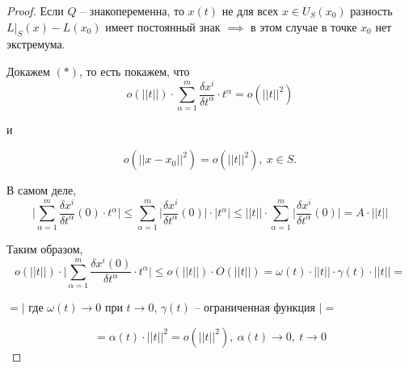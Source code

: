 \documentclass{report}
\theoremstyle{definition}
\begin{document}
\begin{proof}
  Если $Q$ -- знакопеременна, то $x(t)$ не для всех $x \in U_S(x_0)$ разность $L\big|_S(x) - L(x_0)$ имеет постоянный знак $\implies$ в этом случае в точке $x_0$ нет экстремума.

  Докажем $(*)$, то есть покажем, что
  \begin{equation*}
    o(||t||) \cdot \sum_{\alpha = 1}^{m} \frac{\delta x^i}{\delta t^\alpha}\cdot t^\alpha = o(||t||^2)
  \end{equation*}
  \begin{center}
    и
  \end{center}
  \begin{equation*}
    o(||x-x_0||^2) = o(||t||^2), \ x \in S.
  \end{equation*}

  В самом деле,
  \begin{equation*}
    \bigg| \sum_{\alpha=1}^{m}\frac{\delta x^i}{\delta t^\alpha}(0)\cdot t^\alpha\bigg| \leqslant \sum_{\alpha=1}^{m}\bigg|\frac{\delta x^i}{\delta t^\alpha}(0)\bigg| \cdot \big|t^\alpha \big| \leqslant ||t|| \cdot \sum_{\alpha = 1}^{m} \bigg|\frac{\delta x^i}{\delta t^\alpha}(0)\bigg| = A\cdot ||t||
  \end{equation*}

  Таким образом,
  \begin{equation*}
    o(||t||) \cdot \bigg|\sum_{\alpha = 1}^{m}\frac{\delta x^i(0)}{\delta t^\alpha}\cdot t^\alpha \bigg| \leqslant o(||t||)\cdot O(||t||) = \omega(t)\cdot ||t|| \cdot \gamma(t) \cdot ||t|| =
  \end{equation*}
  \begin{center}
    $= \bigg|$ где $\omega(t)\rightarrow0$ при $t\rightarrow 0$, $\gamma(t)$ -- ограниченная функция $\bigg| =$
  \end{center}
  \begin{equation*}
    = \alpha(t) \cdot ||t||^2 = o(||t||^2), \ \alpha(t)\rightarrow 0, \ t\rightarrow 0
  \end{equation*}


\end{proof}
\end{document}
